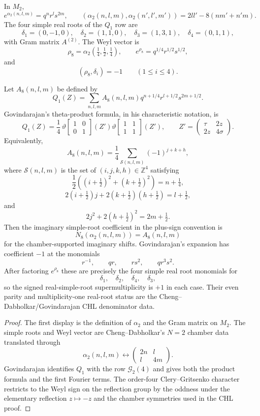 \documentclass[11pt]{memoir}
\newcommand{\Z}{\mathbb{Z}} \newcommand{\C}{\mathbb{C}}
\begin{document}
\begin{lemma}[$Q_1$ in $M_2$ notation]
\label{lem:q1-m2-normalisation}
In $M_2$,
$$
e^{\alpha_2(n,l,m)}=q^nr^ls^{2m},\qquad
(\alpha_2(n,l,m),\alpha_2(n',l',m'))
=2ll'-8(nm'+n'm).
$$
The four simple real roots of the $Q_1$ row are
$$
\delta_1=(0,-1,0),\quad
\delta_2=(1,1,0),\quad
\delta_3=(1,3,1),\quad
\delta_4=(0,1,1),
$$
with Gram matrix $A^{(2)}$.  The Weyl vector is
$$
\rho_8=\alpha_2(\tfrac14,\tfrac12,\tfrac14),\qquad
e^{\rho_8}=q^{1/4}r^{1/2}s^{1/2},
$$
and
$$
(\rho_8,\delta_i)=-1\qquad(1\le i\le4).
$$

Let $A_8(n,l,m)$ be defined by
$$
Q_1(Z)=
\sum_{n,l,m} A_8(n,l,m)
q^{n+1/4}r^{l+1/2}s^{2m+1/2}.
$$
Govindarajan's theta-product formula, in his characteristic notation, is
$$
Q_1(Z)=\frac14\,
\vartheta\!\left[\begin{array}{cc}1&0\\0&1\end{array}\right](Z')
\vartheta\!\left[\begin{array}{cc}1&1\\1&1\end{array}\right](Z'),
\qquad
Z'=\left(\begin{array}{cc}\tau&2z\\2z&4\sigma\end{array}\right).
$$
Equivalently,
$$
A_8(n,l,m)=\frac14\sum_{\mathcal S(n,l,m)}(-1)^{j+k+h},
$$
where $\mathcal S(n,l,m)$ is the set of
$(i,j,k,h)\in\Z^4$ satisfying
$$
\frac12\left((i+\tfrac12)^2+(k+\tfrac12)^2\right)=n+\tfrac14,
$$
$$
2(i+\tfrac12)j+2(k+\tfrac12)(h+\tfrac12)=l+\tfrac12,
$$
and
$$
2j^2+2(h+\tfrac12)^2=2m+\tfrac12.
$$
Then the imaginary simple-root coefficient in the plus-sign convention
is
$$
N_8(\alpha_2(n,l,m))=A_8(n,l,m)
$$
for the chamber-supported imaginary shifts.  Govindarajan's expansion
has coefficient $-1$ at the monomials
$$
r^{-1},\qquad qr,\qquad rs^2,\qquad qr^3s^2.
$$
After factoring $e^{\rho_8}$ these are precisely the four simple real
root monomials for
$$
\delta_1,\quad\delta_2,\quad\delta_4,\quad\delta_3,
$$
so the signed real-simple-root supermultiplicity is \(+1\) in each
case.  Their even parity and multiplicity-one real-root status are the
Cheng--Dabholkar/Govindarajan CHL denominator data.
\end{lemma}

\begin{proof}
The first display is the definition of $\alpha_2$ and the Gram matrix
on $M_2$.  The simple roots and Weyl vector are Cheng--Dabholkar's
$N=2$ chamber data translated through
$$
\alpha_2(n,l,m)\longleftrightarrow
\left(\begin{array}{cc}2n&l\\ l&4m\end{array}\right).
$$
Govindarajan identifies $Q_1$ with the row $\mathcal G_2(4)$ and gives
both the product formula and the first Fourier terms.  The order-four
Clery--Gritsenko character restricts to the Weyl sign on the reflection
group by the oddness under the elementary reflection $z\mapsto -z$ and
the chamber symmetries used in the CHL proof.
\end{proof}
\end{document}
